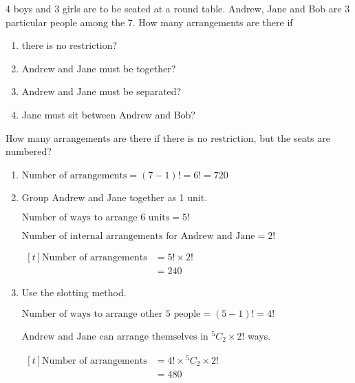 \documentclass[11pt,a4paper]{book}
\begin{document}
\begin{example}

4 boys and 3 girls are to be seated at a round table. Andrew, Jane
and Bob are 3 particular people among the 7. How many arrangements
are there if

\begin{enumerate}[label=(\alph*)]

\item there is no restriction?

\item Andrew and Jane must be together?

\item Andrew and Jane must be separated?

\item Jane must sit between Andrew and Bob?

\end{enumerate}

How many arrangements are there if there is no restriction, but the
seats are numbered?

\Solution

\begin{enumerate}[label=(\alph*)]

\item  $\text{Number of arrangements}=\left(7-1\right)!=6!=720$

\item  Group Andrew and Jane together as 1 unit.

$\text{Number of ways to arrange 6 units}=5!$

$\text{Number of internal arrangements for Andrew and Jane}=2!$

$
\begin{aligned}[t]
\text{Number of arrangements} & =5!\times2!\\
 & =240
\end{aligned}
$

\item \begin{minipage}[t]{.6\textwidth}

Use the slotting method.

$\text{Number of ways to arrange other 5 people}=\left(5-1\right)!=4!$

$\text{Andrew and Jane can arrange themselves in }{}^{5}C_{2}\times2!$ ways.

$
\begin{aligned}[t]
\text{Number of arrangements} & =4!\times{}^{5}C_{2}\times2!\\
 & =480
\end{aligned}
$


\end{minipage}
\end{enumerate}
\end{example}
\end{document}
